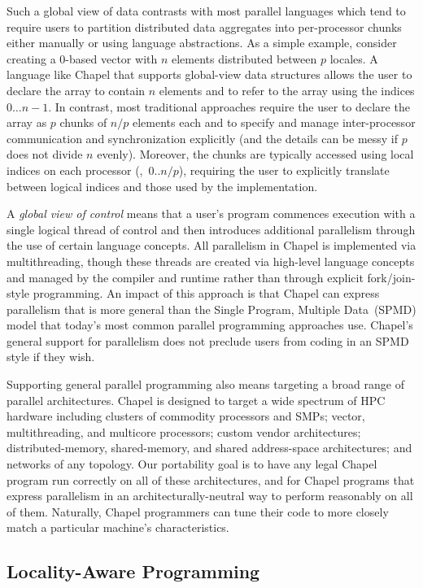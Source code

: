 Such a global view of data contrasts with most parallel languages
which tend to require users to partition distributed data aggregates
into per-processor chunks either manually or using language
abstractions.  As a simple example, consider creating a 0-based vector
with $n$ elements distributed between $p$ locales.  A language like
Chapel that supports global-view data structures allows the user to
declare the array to contain $n$ elements and to refer to the array
using the indices $0 \ldots n-1$.  In contrast, most traditional
approaches require the user to declare the array as $p$ chunks of
$n/p$ elements each and to specify and manage inter-processor
communication and synchronization explicitly (and the details can be
messy if $p$ does not divide $n$ evenly).  Moreover, the chunks are
typically accessed using local indices on each processor
(\eg,~$0..n/p$), requiring the user to explicitly translate between
logical indices and those used by the implementation.

A \emph{global view of control} means that a user's program commences
execution with a single logical thread of control and then introduces
additional parallelism through the use of certain language concepts.
All parallelism in Chapel is implemented via multithreading, though
these threads are created via high-level language concepts and managed
by the compiler and runtime rather than through explicit
fork/join-style programming.  An impact of this approach is that
Chapel can express parallelism that is more general than the Single
Program, Multiple Data~(SPMD) model that today's most common parallel
programming approaches use.  Chapel's general support for parallelism does not
preclude users from coding in an SPMD style if they wish.

Supporting general parallel programming also means targeting a broad
range of parallel architectures.  Chapel is designed to target a wide
spectrum of HPC hardware including clusters of commodity processors
and SMPs; vector, multithreading, and multicore processors; custom
vendor architectures; distributed-memory, shared-memory, and 
shared address-space architectures; and networks of any topology.  Our
portability goal is to have any legal Chapel program run correctly on
all of these architectures, and for Chapel programs that express
parallelism in an architecturally-neutral way to perform reasonably on
all of them.  Naturally, Chapel programmers can tune their code to
more closely match a particular machine's characteristics.

\subsection{Locality-Aware Programming}

